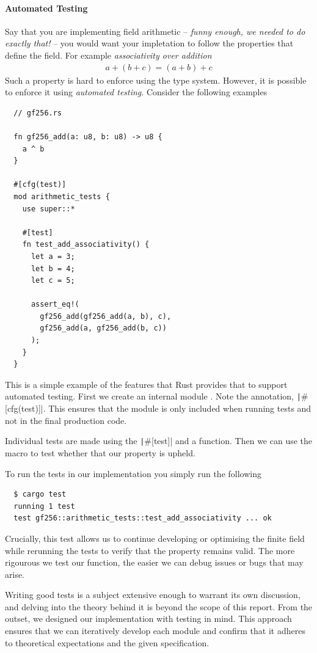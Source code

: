\documentclass[11pt]{report}
\theoremstyle{definition}
\theoremstyle{plain}
\begin{document}
\paragraph{Automated Testing}
Say that you are implementing field arithmetic -- \textit{funny enough, we needed to do exactly that!} -- you would want your impletation to follow the properties that define the field. For example \textit{associativity over addition}
\begin{align}
  a + (b + c) = (a + b) + c
\end{align}
Such a property is hard to enforce using the type system. However, it is possible to enforce it using \textit{automated testing}. Consider the following examples
\begin{verbatim}
  // gf256.rs

  fn gf256_add(a: u8, b: u8) -> u8 {
    a ^ b
  }

  #[cfg(test)]
  mod arithmetic_tests {
    use super::*
    
    #[test]
    fn test_add_associativity() {
      let a = 3;
      let b = 4;
      let c = 5;

      assert_eq!(
        gf256_add(gf256_add(a, b), c), 
        gf256_add(a, gf256_add(b, c))
      );
    }
  }
\end{verbatim}
This is a simple example of the features that Rust provides that to support automated testing. First we create an internal module . Note the annotation, \texttt|#[cfg(test)]|. This ensures that the module is only included when running tests and not in the final production code.

Individual tests are made using the \texttt|#[test]| and a function. Then we can use the macro  to test whether that our property is upheld.

To run the tests in our implementation you simply run the following
\begin{verbatim}
  $ cargo test
  running 1 test
  test gf256::arithmetic_tests::test_add_associativity ... ok
\end{verbatim}
Crucially, this test allows us to continue developing or optimising the finite field while rerunning the tests to verify that the property remains valid. The more rigourous we test our function, the easier we can debug issues or bugs that may arise.

Writing good tests is a subject extensive enough to warrant its own discussion, and delving into the theory behind it is beyond the scope of this report. From the outset, we designed our implementation with testing in mind. This approach ensures that we can iteratively develop each module and confirm that it adheres to theoretical expectations and the given specification.
\end{document}
